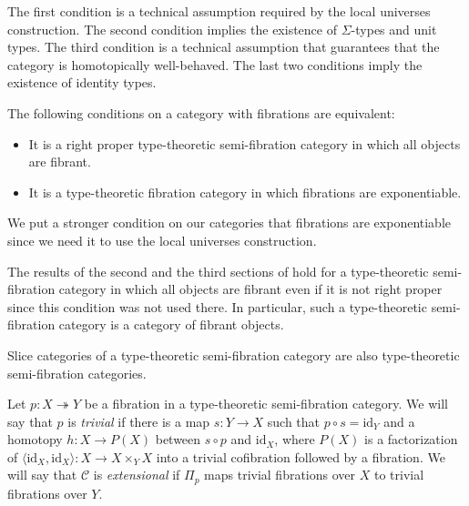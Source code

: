 \documentclass[reqno]{amsart}
\theoremstyle{definition}
\theoremstyle{remark}
\newcommand{\fs}[1]{\mathrm{#1}}
\newcommand{\scat}[1]{\mathcal{#1}}
\newcommand{\id}{\fs{id}}
\numberwithin{figure}{section}
\begin{document}
The first condition is a technical assumption required by the local universes construction.
The second condition implies the existence of $\Sigma$-types and unit types.
The third condition is a technical assumption that guarantees that the category is homotopically well-behaved.
The last two conditions imply the existence of identity types.

The following conditions on a category with fibrations are equivalent:
\begin{itemize}
\item It is a right proper type-theoretic semi-fibration category in which all objects are fibrant.
\item It is a type-theoretic fibration category in which fibrations are exponentiable.
\end{itemize}
We put a stronger condition on our categories that fibrations are exponentiable since we need it to use the local universes construction.

\begin{remark}
The results of the second and the third sections of \cite{shul-inv} hold for a type-theoretic semi-fibration category in which all objects are fibrant even if it is not right proper since this condition was not used there.
In particular, such a type-theoretic semi-fibration category is a category of fibrant objects.
\end{remark}

\begin{remark}
Slice categories of a type-theoretic semi-fibration category are also type-theoretic semi-fibration categories.
\end{remark}

Let $p : X \twoheadrightarrow Y$ be a fibration in a type-theoretic semi-fibration category.
We will say that $p$ is \emph{trivial} if there is a map $s : Y \to X$ such that $p \circ s = \id_Y$ and a homotopy $h : X \to P(X)$ between $s \circ p$ and $\id_X$,
where $P(X)$ is a factorization of $\langle \id_X, \id_X \rangle : X \to X \times_Y X$ into a trivial cofibration followed by a fibration.
We will say that $\scat{C}$ is \emph{extensional} if $\Pi_p$ maps trivial fibrations over $X$ to trivial fibrations over $Y$.
\end{document}
